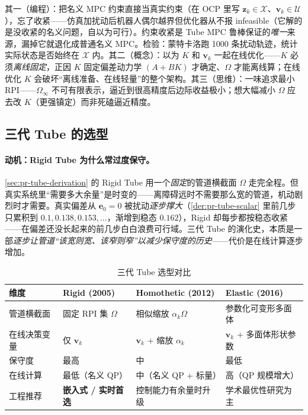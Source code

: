 \begin{pitfall}
其一（编程）：把名义 MPC 约束直接当真实约束（在 OCP 里写 $\mathbf{z}_k\in\mathcal{X}$、$\mathbf{v}_k\in\mathcal{U}$），忘了收紧——仿真加扰动后机器人偶尔越界但优化器从不报 infeasible（它解的是没收紧的名义问题，自以为可行）。约束收紧是 Tube MPC 鲁棒保证的\emph{唯一}来源，漏掉它就退化成普通名义 MPC。检验：蒙特卡洛跑 1000 条扰动轨迹，统计实际状态是否始终在 $\mathcal{X}$ 内。其二（概念）：以为 $K$ 和 $\mathbf{v}_k$ 一起在线优化——$K$ 必须\emph{离线固定}，正因 $K$ 固定偏差动力学 $(A+BK)$ 才确定、$\Omega$ 才能离线算；在线优化 $K$ 会破坏“离线准备、在线轻量”的整个架构。其三（思维）：一味追求最小 RPI——$\Omega_\infty$ 不可有限表示，逼近到很高精度后边际收益极小；想大幅减小 $\Omega$ 应去改 $K$（更强镇定）而非死磕逼近精度。
\end{pitfall}

\subsection{三代 Tube 的选型}
\label{sec:pr-tube-gen}

\paragraph{动机：Rigid Tube 为什么常过度保守。}
\cref{sec:pr-tube-derivation} 的 Rigid Tube 用一个\emph{固定}的管道横截面 $\Omega$ 走完全程。但真实系统里“需要多大余量”是时变的——离障碍远时不需要那么宽的管道，机动剧烈时才需要。真实偏差从 $\mathbf{e}_0=0$ 被扰动\emph{逐步撑大}（\cref{der:pr-tube-scalar} 里前几步只累积到 $0.1,0.138,0.153,\dots$，渐增到稳态 $0.162$），Rigid 却每步都按稳态收紧——在偏差还没长起来的前几步白白浪费可行域。三代 Tube 的演化史，本质是一部\emph{逐步让管道“该宽则宽、该窄则窄”以减少保守度的历史}——代价是在线计算逐步增加。

\begin{table}[H]\centering\small
\caption{三代 Tube 选型对比}
\label{tab:pr-tube}
\begin{tabular}{p{} p{} p{} p{}}
\toprule
维度 & Rigid (2005) & Homothetic (2012) & Elastic (2016) \\
\midrule
管道横截面 & 固定 RPI 集 $\Omega$ & 相似缩放 $\alpha_k\Omega$ & 参数化可变形多面体 \\
在线决策变量 & 仅 $\mathbf{v}_k$ & $\mathbf{v}_k$ + 缩放 $\alpha_k$ & $\mathbf{v}_k$ + 多面体形状参数 \\
保守度 & 最高 & 中 & 最低 \\
在线计算 & 最低（名义 QP） & 中（名义 QP + 标量） & 高（QP 规模增大） \\
工程推荐 & \textbf{嵌入式 / 实时首选} & 控制能力有余量时升级 & 学术最优性研究为主 \\
\bottomrule
\end{tabular}
\end{table}

